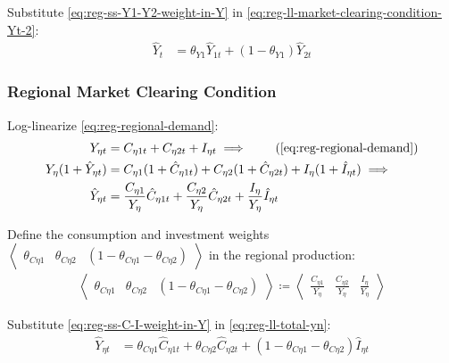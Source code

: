 \documentclass[
thesis.tex
]{subfiles}
\begin{document}
Substitute \ref{eq:reg-ss-Y1-Y2-weight-in-Y} in \ref{eq:reg-ll-market-clearing-condition-Yt-2}:
\begin{align}
	\hat{Y}_{t} &= \theta_{Y1} \hat{Y}_{1t} + (1-\theta_{Y1}) \hat{Y}_{2t} \label{eq:reg-ll-market-clearing-condition-Yt-3}
\end{align}


\subsubsection*{Regional Market Clearing Condition}

Log-linearize \ref{eq:reg-regional-demand}:
\begin{align}
	Y_{\eta t} &= C_{\eta 1 t} + C_{\eta 2 t} + I_{\eta t} \implies \tag{\ref{eq:reg-regional-demand}} \\
	Y_{\eta} (1 +\hat{Y}_{\eta t}) &= C_{\eta 1} (1 +\hat{C}_{\eta 1 t}) + C_{\eta 2} (1 +\hat{C}_{\eta 2 t}) + I_{\eta} (1 +\hat{I}_{\eta t}) \implies \nonumber \\
	\hat{Y}_{\eta t} &= \frac{C_{\eta 1}}{Y_{\eta}} \hat{C}_{\eta 1 t} + \frac{C_{\eta 2}}{Y_{\eta}} \hat{C}_{\eta 2 t} + \frac{I_{\eta}}{Y_{\eta}} \hat{I}_{\eta t} \label{eq:reg-ll-total-yn}
\end{align}

Define the consumption and investment weights $\left\langle \begin{smallmatrix} \theta_{C\eta 1} & \theta_{C\eta 2} & (1 - \theta_{C\eta 1} - \theta_{C\eta 2}) \end{smallmatrix} \right\rangle$ in the regional production:
\begin{align}
	\label{eq:reg-ss-C-I-weight-in-Y}
	\left\langle \begin{matrix} \theta_{C\eta 1} & \theta_{C\eta 2} & (1 - \theta_{C\eta 1} - \theta_{C\eta 2}) \end{matrix} \right\rangle \coloneq \left\langle \begin{matrix} \frac{C_{\eta 1}}{Y_{\eta}} & \frac{C_{\eta 2}}{Y_{\eta}} & \frac{I_{\eta}}{Y_{\eta}} \end{matrix} \right\rangle
\end{align}

Substitute \ref{eq:reg-ss-C-I-weight-in-Y} in \ref{eq:reg-ll-total-yn}:
\begin{align}
	\hat{Y}_{\eta t} &= \theta_{C\eta 1} \hat{C}_{\eta 1 t} + \theta_{C\eta 2} \hat{C}_{\eta 2 t} + (1 - \theta_{C\eta 1} - \theta_{C\eta 2}) \hat{I}_{\eta t} \label{eq:reg-ll-total-yn-2}
\end{align}
\end{document}
